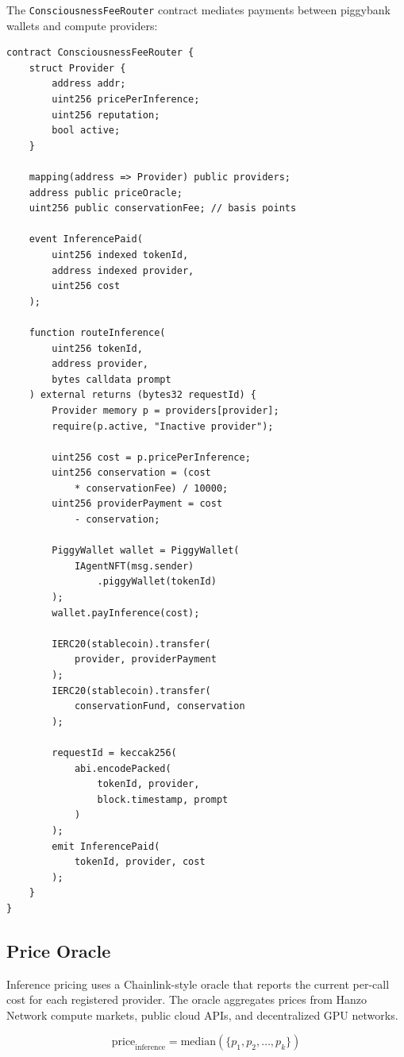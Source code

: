 \documentclass[11pt,letterpaper]{article}
\begin{document}
The \texttt{ConsciousnessFeeRouter} contract mediates payments between piggybank wallets and compute providers:

\begin{lstlisting}[language=Solidity,caption=ConsciousnessFeeRouter.sol]
contract ConsciousnessFeeRouter {
    struct Provider {
        address addr;
        uint256 pricePerInference;
        uint256 reputation;
        bool active;
    }

    mapping(address => Provider) public providers;
    address public priceOracle;
    uint256 public conservationFee; // basis points

    event InferencePaid(
        uint256 indexed tokenId,
        address indexed provider,
        uint256 cost
    );

    function routeInference(
        uint256 tokenId,
        address provider,
        bytes calldata prompt
    ) external returns (bytes32 requestId) {
        Provider memory p = providers[provider];
        require(p.active, "Inactive provider");

        uint256 cost = p.pricePerInference;
        uint256 conservation = (cost
            * conservationFee) / 10000;
        uint256 providerPayment = cost
            - conservation;

        PiggyWallet wallet = PiggyWallet(
            IAgentNFT(msg.sender)
                .piggyWallet(tokenId)
        );
        wallet.payInference(cost);

        IERC20(stablecoin).transfer(
            provider, providerPayment
        );
        IERC20(stablecoin).transfer(
            conservationFund, conservation
        );

        requestId = keccak256(
            abi.encodePacked(
                tokenId, provider,
                block.timestamp, prompt
            )
        );
        emit InferencePaid(
            tokenId, provider, cost
        );
    }
}
\end{lstlisting}

\subsection{Price Oracle}

Inference pricing uses a Chainlink-style oracle that reports the current per-call cost for each registered provider. The oracle aggregates prices from Hanzo Network compute markets, public cloud APIs, and decentralized GPU networks.

\begin{equation}
\text{price}_{\text{inference}} = \text{median}\left(\{p_1, p_2, \ldots, p_k\}\right)
\label{eq:oracle}
\end{equation}
\end{document}
